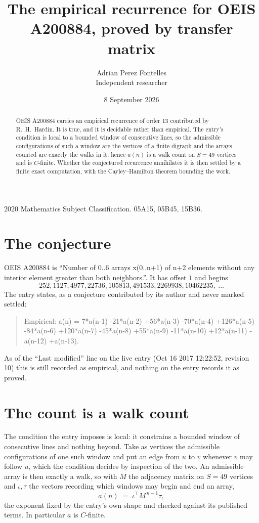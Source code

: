 \documentclass[11pt,a4paper]{article}
\title{The empirical recurrence for OEIS A200884, proved by transfer matrix}
\author{Adrian Perez Fontelles\\ \small Independent researcher}
\date{8 September 2026}
\theoremstyle{plain}
\theoremstyle{definition}
\begin{document}
\maketitle

\begin{abstract}
OEIS A200884 carries an empirical recurrence of order $13$ contributed by R.~H.~Hardin. It is
true, and it is decidable rather than empirical. The entry's condition is local to a bounded window of consecutive lines, so
the admissible configurations of such a window are the vertices of a finite digraph and the
arrays counted are exactly the walks in it; hence $a(n)$ is a walk count on $S=49$ vertices
and is $C$-finite. Whether the conjectured recurrence annihilates it is then settled by a
finite exact computation, with the Cayley--Hamilton theorem bounding the work.
\end{abstract}

\noindent\small 2020 Mathematics Subject Classification. 05A15, 05B45, 15B36.\normalsize

\section{The conjecture}

OEIS A200884 is ``Number of 0..6 arrays x(0..n+1) of n+2 elements without any interior element greater than both neighbors.''. It has offset $1$ and begins
\[
252, 1127, 4977, 22736, 105813, 491533, 2269938, 10462235,\ \dots
\]
The entry states, as a conjecture contributed by its author and never marked settled:
\begin{quote}
Empirical: a(n) = 7*a(n-1) -21*a(n-2) +56*a(n-3) -70*a(n-4) +126*a(n-5) -84*a(n-6) +120*a(n-7) -45*a(n-8) +55*a(n-9) -11*a(n-10) +12*a(n-11) -a(n-12) +a(n-13).
\end{quote}
As of the ``Last modified'' line on the live entry (Oct 16 2017 12:22:52, revision 10) this is still
recorded as empirical, and nothing on the entry records it as proved.

\section{The count is a walk count}

The condition the entry imposes is local: it constrains a bounded window of consecutive lines and nothing beyond. Take as
vertices the admissible configurations of one such window and put an edge from $u$ to $v$
whenever $v$ may follow $u$, which the condition decides by inspection of the two. An
admissible array is then exactly a walk, so with $M$ the adjacency matrix on $S=49$ vertices
and $\iota,\tau$ the vectors recording which windows may begin and end an array,
\[
a(n)\;=\;\iota^{\!\top}M^{\,n-1}\tau ,
\]
the exponent fixed by the entry's own shape and checked against its published terms. In
particular $a$ is $C$-finite.
\end{document}
